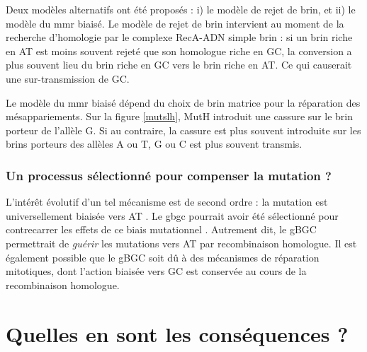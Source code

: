 \documentclass[11pt, oneside]{scrartcl}
\begin{document}
Deux modèles alternatifs ont été proposés\cite{lesecque_gc-biased_2013} : i) le
modèle de rejet de brin, et ii) le modèle du \ac{mmr} biaisé. Le modèle de rejet
de brin intervient au moment de la recherche d'homologie par le complexe
RecA-ADN simple brin : si un brin riche en AT est moins souvent rejeté que son
homologue riche en GC, la conversion a plus souvent lieu du brin riche en GC
vers le brin riche en AT. Ce qui causerait une sur-transmission de GC. 

Le modèle du \ac{mmr} biaisé dépend du choix de brin matrice pour la réparation
des mésappariements. Sur la figure \ref{mutslh}, MutH introduit une cassure sur
le brin porteur de l'allèle G. Si au contraire, la cassure est plus souvent
introduite sur les brins porteurs des allèles A ou T, G ou C est plus souvent
transmis. 

\subsubsection*{Un processus sélectionné pour compenser la mutation ?}
\label{sec:orgheadline10}

L'intérêt évolutif d'un tel mécanisme est de second ordre : la mutation est
universellement biaisée vers AT \cite{lynch_rate_2010,hershberg_evidence_2010}.
Le \ac{gbgc} pourrait avoir été sélectionné pour contrecarrer les effets de ce
biais mutationnel \cite{marais_biased_2003, birdsell_integrating_2002}.
Autrement dit, le gBGC permettrait de \emph{guérir} les mutations vers AT par
recombinaison homologue. Il est également possible que le gBGC soit dû à des
mécanismes de réparation mitotiques, dont l'action biaisée vers GC est conservée
au cours de la recombinaison homologue\cite{duret_biased_2009}.

\section{Quelles en sont les conséquences ?}
\label{sec:orgheadline17}
\end{document}
